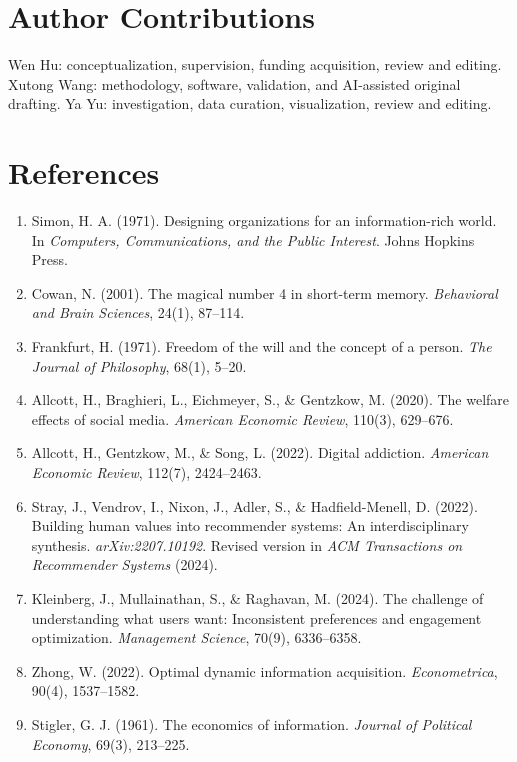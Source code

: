 \documentclass[
  11pt]{article}
\begin{document}
\section{Author Contributions}\label{author-contributions}

Wen Hu: conceptualization, supervision, funding acquisition, review and editing. Xutong Wang: methodology, software, validation, and AI-assisted original drafting. Ya Yu: investigation, data curation, visualization, review and editing.

\section{References}\label{references}

\begin{enumerate}
\def\labelenumi{\arabic{enumi}.}
\item
  Simon, H. A. (1971). Designing organizations for an information-rich world. In \emph{Computers, Communications, and the Public Interest}. Johns Hopkins Press.
\item
  Cowan, N. (2001). The magical number 4 in short-term memory. \emph{Behavioral and Brain Sciences}, 24(1), 87--114.
\item
  Frankfurt, H. (1971). Freedom of the will and the concept of a person. \emph{The Journal of Philosophy}, 68(1), 5--20.
\item
  Allcott, H., Braghieri, L., Eichmeyer, S., \& Gentzkow, M. (2020). The welfare effects of social media. \emph{American Economic Review}, 110(3), 629--676.
\item
  Allcott, H., Gentzkow, M., \& Song, L. (2022). Digital addiction. \emph{American Economic Review}, 112(7), 2424--2463.
\item
  Stray, J., Vendrov, I., Nixon, J., Adler, S., \& Hadfield-Menell, D. (2022). Building human values into recommender systems: An interdisciplinary synthesis. \emph{arXiv:2207.10192}. Revised version in \emph{ACM Transactions on Recommender Systems} (2024).
\item
  Kleinberg, J., Mullainathan, S., \& Raghavan, M. (2024). The challenge of understanding what users want: Inconsistent preferences and engagement optimization. \emph{Management Science}, 70(9), 6336--6358.
\item
  Zhong, W. (2022). Optimal dynamic information acquisition. \emph{Econometrica}, 90(4), 1537--1582.
\item
  Stigler, G. J. (1961). The economics of information. \emph{Journal of Political Economy}, 69(3), 213--225.

\end{enumerate}
\end{document}
